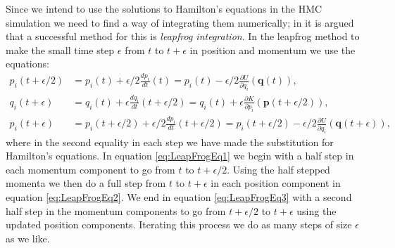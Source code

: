 \documentclass[12pt]{article}
\begin{document}
            Since we intend to use the solutions to Hamilton's equations in the HMC simulation we need to find a way of integrating them numerically; in \cite{neal_2011} it is argued that a successful method for this is \textit{leapfrog integration}. In the leapfrog method to make the small time step $\epsilon$ from $t$ to $t+\epsilon$ in position and momentum we use the equations:
            \begin{align}
                \label{eq:LeapFrogEq1} p_i\left(t+\epsilon/2\right) & = p_i\left(t\right) + \epsilon/2\frac{dp_i}{dt}\left(t\right) = p_i\left(t\right) - \epsilon/2\frac{\partial U}{\partial q_i}\left(\bm{q}\left(t\right)\right), \\
                \label{eq:LeapFrogEq2}q_i\left(t+\epsilon\right) & = q_i\left(t\right) + \epsilon\frac{dq_i}{dt}\left(t+\epsilon/2\right) = q_i\left(t\right) + \epsilon\frac{\partial K}{\partial p_i}\left(\bm{p}\left(t+\epsilon/2\right)\right), \\
                \label{eq:LeapFrogEq3}p_i\left(t+\epsilon\right) & = p_i\left(t+\epsilon/2\right) + \epsilon/2\frac{dp_i}{dt}\left(t+\epsilon/2\right) = p_i\left(t+\epsilon/2\right) - \epsilon/2\frac{\partial U}{\partial q_i}\left(\bm{q}\left(t+\epsilon\right)\right),
            \end{align}
            where in the second equality in each step we have made the substitution for Hamilton's equations.
            In equation \ref{eq:LeapFrogEq1} we begin with a half step in each momentum component to go from $t$ to $t+\epsilon/2$. Using the half stepped momenta we then do a full step from $t$ to $t+\epsilon$ in each position component in equation \ref{eq:LeapFrogEq2}. We end in equation \ref{eq:LeapFrogEq3} with a second half step in the momentum components to go from $t+\epsilon/2$ to $t+\epsilon$ using the updated position components. Iterating this process we do as many steps of size $\epsilon$ as we like.
\end{document}
